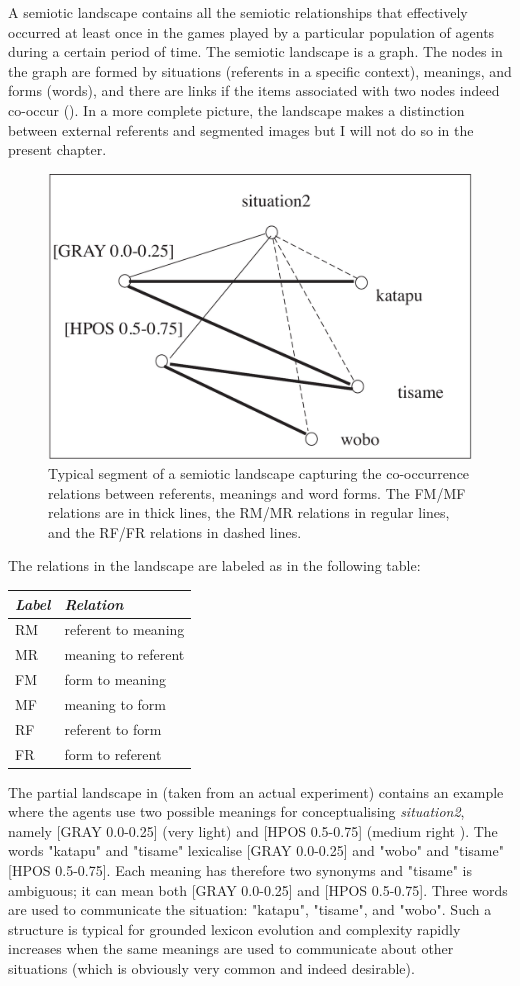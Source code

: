 A semiotic landscape contains all the semiotic relationships
that effectively occurred at least once
in the games played by a particular population of agents
during a certain period of time. 
The semiotic landscape is a graph. The nodes in the
graph are formed by situations (referents in a specific context), 
meanings, and forms (words),
and there are links if the items associated with two nodes
indeed co-occur (). In a more complete
picture, the landscape makes a distinction between 
external referents and segmented images but I will not 
do so in the present chapter. 
\begin{figure}[htbp]
  \centerline{\includegraphics[width=.65\textwidth]{chap7/figs/landscape}}
\caption{ \label{RMF1} Typical segment of a semiotic
landscape capturing the co-occurrence relations between
referents, meanings and word forms. The FM/MF relations are
in thick lines, the RM/MR relations in regular lines, and 
the RF/FR relations in dashed lines.}
\end{figure}
The relations in the landscape are labeled as in 
the following table:
\begin{center}
\begin{tabular}{| l | l | } \hline
{\it Label}& {\it Relation } \\ \hline
RM & referent to meaning \\ \hline
MR & meaning to referent \\ \hline
FM & form to meaning\\ \hline
MF & meaning to form\\ \hline
RF & referent to form \\ \hline
FR & form to referent  \\ \hline
\end{tabular}
\end{center}

The partial landscape in  (taken from
an actual experiment) contains an example where the agents use
two possible meanings for conceptualising {\it situation2}, namely
[GRAY 0.0-0.25] (very light) and [HPOS 0.5-0.75]
(medium right ). The words "katapu" and "tisame" lexicalise
[GRAY 0.0-0.25] and "wobo" and "tisame" [HPOS 0.5-0.75]. 
Each meaning has therefore two synonyms and "tisame" is 
ambiguous; it can mean both [GRAY 0.0-0.25]
and [HPOS 0.5-0.75]. Three words
are used to communicate the situation: "katapu", "tisame", 
and "wobo". Such a structure is typical for grounded
lexicon evolution and complexity rapidly increases when the
same meanings are used to communicate about other
situations (which is obviously very common and indeed desirable). 

